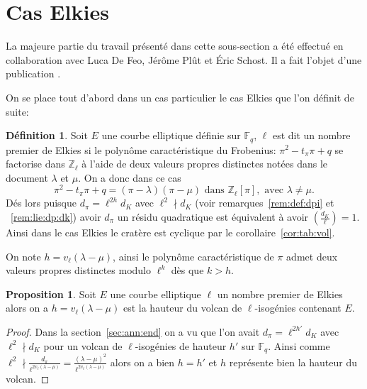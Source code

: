 \documentclass[10pt,a4paper]{book}
\theoremstyle{plain}
\theoremstyle{definition}
\theoremstyle{definition}
\theoremstyle{definition}
\newtheorem{prop}[thm]{Proposition}
\theoremstyle{definition}
\newtheorem{defi}[thm]{Définition}
\theoremstyle{remark}
\theoremstyle{remark}
\theoremstyle{definition}
\begin{document}
\section{Cas Elkies}

La majeure partie du travail présenté dans cette sous-section a été effectué en
collaboration avec Luca De Feo, Jér\^ome Pl\^ut et \'Eric Schost. Il a fait 
l'objet d'une publication \cite{Defeo_Plut_Schost_2016}.

On se place tout d'abord dans un cas particulier le cas Elkies que l'on définit de suite: 
\begin{defi}
\label{def:cas:elk}
Soit $E$ une courbe elliptique définie sur $\mathbb{F}_q$, $\ell$ est dit un 
nombre premier de Elkies si le polynôme caractéristique du Frobenius: 
$\pi^2-t_{\pi}\pi + q$ se factorise dans $\mathbb{Z}_{\ell}$ à l'aide de deux 
valeurs propres distinctes notées dans le document $\lambda$ et $\mu$. On a 
donc dans ce cas
\begin{equation*}
\pi^2 - t_{\pi}\pi + q = (\pi - \lambda)(\pi - \mu) \text{ dans } \mathbb{Z}_{\ell}[\pi], \text{ avec } \lambda \neq \mu.
\end{equation*}
Dés lors puisque $d_{\pi}=\ell^{2h}d_{K}$ avec $\ell^2 \nmid d_{K}$ (voir 
remarques~\ref{rem:def:dpi} et ~\ref{rem:lie:dp:dk}) avoir 
$d_{\pi}$ un résidu quadratique est équivalent à avoir $\left( 
\frac{d_{K}}{\ell} \right)=1$. Ainsi dans le cas Elkies le cratère est cyclique
par le corollaire~\ref{cor:tab:vol}.
\end{defi}

On note $h=v_{\ell}(\lambda - \mu)$, ainsi le polynôme caractéristique de 
$\pi$ admet deux valeurs propres distinctes modulo $\ell^k$ dès que $k > h$.

\begin{prop}
\label{pro:hau:vol}
Soit $E$ une courbe elliptique $\ell$ un nombre premier de Elkies alors on a 
$h=v_{\ell}(\lambda - \mu)$ est la hauteur du volcan de $\ell$-isogénies 
contenant $E$.
\end{prop}

\begin{proof}
Dans la section~\ref{sec:ann:end} on a vu que l'on avait $d_{\pi}=\ell^{2h'}d_K$ 
avec $\ell^2 \nmid d_K$ pour un volcan de $\ell$-isogénies de hauteur $h'$ sur 
$\mathbb{F}_q$. Ainsi comme $\ell^{2} \nmid  \frac{d_\pi}{\ell^{2 v_{\ell}
(\lambda - \mu)}}=\frac{(\lambda - \mu)^2}{\ell^{2 v_{\ell}(\lambda - \mu)}}$ 
alors on a bien $h=h'$ et $h$ représente bien la hauteur du volcan. 
\end{proof}
 
\end{document}
